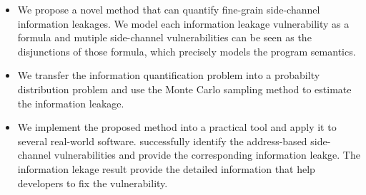\begin{itemize}
	\item We propose a novel method that can quantify fine-grain side-channel
        information leakages. We model each information leakage vulnerability as a formula and 
        mutiple side-channel vulnerabilities can be seen as the disjunctions of those formula, which
        precisely models the program semantics.
        \item We transfer the information quantification problem into a probabilty distribution problem and 
        use the Monte Carlo sampling method to estimate the information leakage. %
	\item We implement the proposed method into a practical tool and apply it to several real-world software. \tool{} 
        successfully identify the address-based side-channel vulnerabilities and provide the corresponding
        information leakge. The information lekage result provide the detailed information that help developers
        to fix the vulnerability.
\end{itemize}




